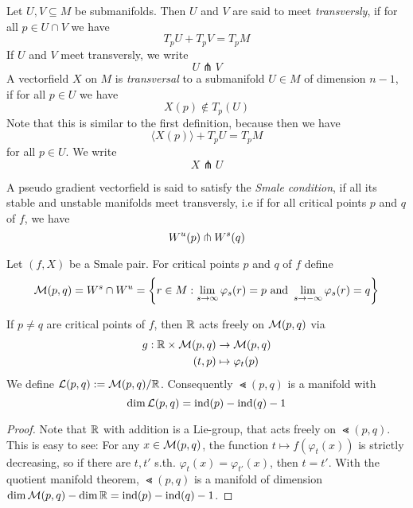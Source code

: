 \begin{definition}[Transversality]
    Let $U, V \subseteq M$ be submanifolds. Then $U$ and $V$ are said to meet 
    \textit{transversly}, if for all $p \in U \cap V$ we have
    \[ T_pU + T_pV = T_pM \]
    If $U$ and $V$ meet transversly, we write
    \[ U \pitchfork V \]
    A vectorfield $X$ on $M$ is \textit{transversal} to a submanifold $U \in M$ of dimension
    $n - 1$, if for all $p \in U$ we have 
    \[ X(p) \notin T_p(U) \]
    Note that this is similar to the first definition, because then we have
    \[ \langle X(p) \rangle + T_pU = T_pM \]
    for all $p \in U$.
    We write 
    \[ X \pitchfork U \]
\end{definition}

\begin{definition}
    A pseudo gradient vectorfield is said to satisfy the \textit{Smale condition}, if
    all its stable and unstable manifolds meet transversly, i.e if for all critical points
    $p$ and $q$ of $f$, we have
    \[ W^u(p) \pitchfork { W^s }(q) \]
\end{definition}

\begin{prop}
    Let $(f, X)$ be a Smale pair. For critical points $p$ and $q$ of $f$ define
    \[ { \mathcal{M} }(p, q) = { W^s } \cap W^u = 
    \left\{ r \in M : \lim_{s \to \infty} \varphi_s(r) = p \text{ and } 
    \lim_{s \to -\infty} \varphi_s(r) = q \right\} \]
\end{prop}

\begin{prop}
    If $p \neq q$ are critical points of $f$, then
    ${ \mathbb R }$ acts freely on ${ \mathcal{M} }(p, q)$ via 
    \begin{align*}
        g: { \mathbb R } \times { \mathcal{M} }(p, q) & \to { \mathcal{M} }(p, q) \\
        (t, p) & \mapsto \varphi_t(p)
    \end{align*}
    We define ${ \mathcal{L} }(p, q) := { \mathcal{M} }(p, q)/{ \mathbb R }$. 
    Consequently $\Lt(p, q)$ is a manifold with 
    \[ \dim { \mathcal{L} }(p, q)  = { \operatorname{ind} } (p) - { \operatorname{ind} } (q) - 1 \]
\end{prop}

\begin{proof}
    Note that ${ \mathbb R }$ with addition is a Lie-group, that acts freely on $\Lt(p, q)$. 
    This is easy to see:
    For any $x \in { \mathcal{M} }(p, q)$, the function $t \mapsto f(\varphi_t(x))$ is strictly
    decreasing, so if there are $t, t'$ s.th. $\varphi_t(x) = \varphi_{t'}(x)$, then
    $t = t'$. With the quotient manifold theorem, $\Lt(p, q)$ is a manifold of dimension
    $\dim { \mathcal{M} }(p, q) - \dim { \mathbb R } = { \operatorname{ind} } (p) - { \operatorname{ind} } (q) - 1 $.
\end{proof}

